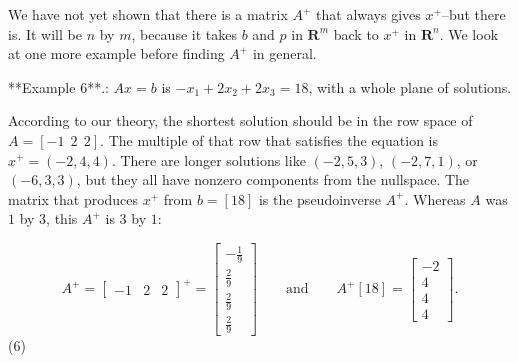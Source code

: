 We have not yet shown that there is a matrix \(A^{+}\) that always gives \(x^{+}\)--but there is. It will be \(n\) by \(m\), because it takes \(b\) and \(p\) in \(\mathbf{R}^{m}\) back to \(x^{+}\) in \(\mathbf{R}^{n}\). We look at one more example before finding \(A^{+}\) in general.

**Example 6**.: \(Ax=b\) is \(-x_{1}+2x_{2}+2x_{3}=18\), with a whole plane of solutions.

According to our theory, the shortest solution should be in the row space of \(A=[-1\ \ 2\ \ 2]\). The multiple of that row that satisfies the equation is \(x^{+}=(-2,4,4)\). There are longer solutions like \((-2,5,3)\), \((-2,7,1)\), or \((-6,3,3)\), but they all have nonzero components from the nullspace. The matrix that produces \(x^{+}\) from \(b=[18]\) is the pseudoinverse \(A^{+}\). Whereas \(A\) was \(1\) by \(3\), this \(A^{+}\) is \(3\) by \(1\):

\[A^{+}=\begin{bmatrix}-1&2&2\end{bmatrix}^{+}=\begin{bmatrix}-\frac{1}{9}\\ \frac{2}{9}\\ \frac{2}{9}\\ \frac{2}{9}\end{bmatrix}\qquad\text{and}\qquad A^{+}[18]=\begin{bmatrix}-2 \\ 4\\ 4\\ 4\end{bmatrix}.\] (6) 